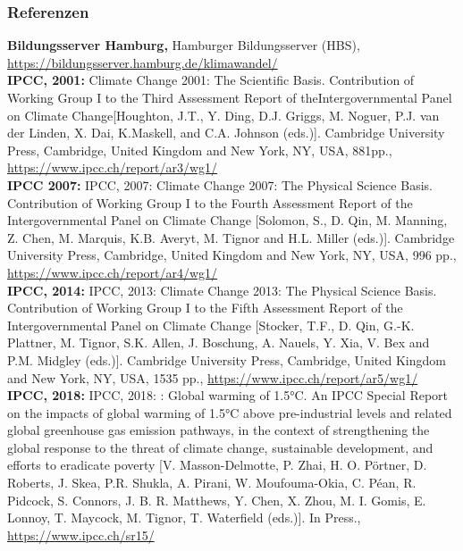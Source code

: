 \begin{frame}
	\frametitle{Referenzen}
	\small{
	\textbf{Bildungsserver Hamburg,} Hamburger Bildungsserver (HBS), \url{https://bildungsserver.hamburg.de/klimawandel/} \\

	\textbf{IPCC, 2001:} Climate Change 2001: The Scientific Basis. Contribution of Working Group I to the Third Assessment Report of theIntergovernmental Panel on Climate Change[Houghton, J.T., Y. Ding, D.J. Griggs, M. Noguer, P.J. van der Linden, X. Dai, K.Maskell, and C.A. Johnson (eds.)]. Cambridge University Press, Cambridge, United Kingdom and New York, NY, USA, 881pp., \url{https://www.ipcc.ch/report/ar3/wg1/}\\

	\textbf{IPCC 2007:} IPCC, 2007: Climate Change 2007: The Physical Science Basis. Contribution of Working Group I to the Fourth Assessment Report of the Intergovernmental Panel on Climate Change [Solomon, S., D. Qin, M. Manning, Z. Chen, M. Marquis, K.B. Averyt, M. Tignor and H.L. Miller (eds.)]. Cambridge University Press, Cambridge, United Kingdom and New York, NY, USA, 996 pp.,  \url{https://www.ipcc.ch/report/ar4/wg1/}\\

	\textbf{IPCC, 2014:} IPCC, 2013: Climate Change 2013: The Physical Science Basis. Contribution of Working Group I to the Fifth Assessment Report of the Intergovernmental Panel on Climate Change [Stocker, T.F., D. Qin, G.-K. Plattner, M. Tignor, S.K. Allen, J. Boschung, A. Nauels, Y. Xia, V. Bex and P.M. Midgley (eds.)]. Cambridge University Press, Cambridge, United Kingdom and New York, NY, USA, 1535 pp., \url{https://www.ipcc.ch/report/ar5/wg1/}\\

	\textbf{IPCC, 2018:} IPCC, 2018: : Global warming of 1.5°C. An IPCC Special Report on the impacts of global warming of 1.5°C above pre-industrial levels and related global greenhouse gas emission pathways, in the context of strengthening the global response to the threat of climate change, sustainable development, and efforts to eradicate poverty [V. Masson-Delmotte, P. Zhai, H. O. Pörtner, D. Roberts, J. Skea, P.R. Shukla, A. Pirani, W. Moufouma-Okia, C. Péan, R. Pidcock, S. Connors, J. B. R. Matthews, Y. Chen, X. Zhou, M. I. Gomis, E. Lonnoy, T. Maycock, M. Tignor, T. Waterfield (eds.)]. In Press., \url{https://www.ipcc.ch/sr15/}\\
	}
\end{frame}

